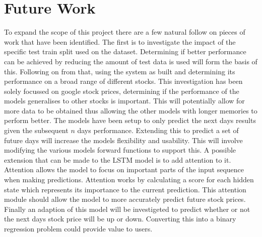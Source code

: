 \documentclass[10pt,twocolumn,letterpaper]{article}
\begin{document}
\section{Future Work}
To expand the scope of this project there are a few natural follow on pieces of work that 
have been identified. The first is to investigate the impact of the specific test train 
split used on the dataset. Determining if better performance can be achieved by reducing
the amount of test data is used will form the basis of this. Following on from that,
using the system as built and determining its performance on a broad range of different 
stocks. This investigation has been solely focussed on google stock prices, determining 
if the performance of the models generalises to other stocks is important. This will 
potentially allow for more data to be obtained thus allowing the other models with longer 
memories to perform better. 
The models have been setup to only predict the next days results given the subsequent $n$
days performance. Extending this to predict a set of future days will increase the models 
flexibility and usability. This will involve modifying the various models forward functions 
to support this. A possible extension that can be made to the LSTM model is to add attention 
to it. Attention allows the model to focus on important parts of the input sequence when 
making predictions. Attention works by calculating a score for each hidden state which 
represents its importance to the current prediction. This attention module should allow 
the model to more accurately predict future stock prices.
Finally an adaption of this model will be investigeted to predict whether or not the next 
days stock price will be up or down. Converting this into a binary regression problem 
could provide value to users.

\small


\end{document}
